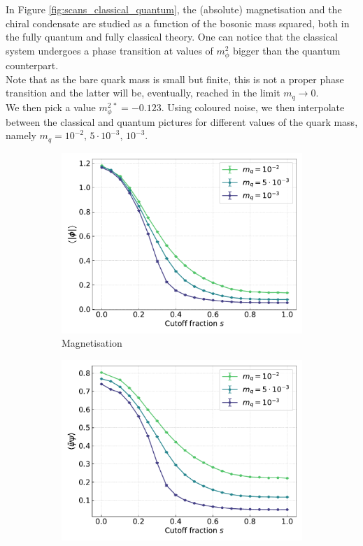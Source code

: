 In Figure \ref{fig:scans_classical_quantum}, the (absolute) magnetisation and the chiral condensate are studied as a function of the bosonic mass squared, both in the fully quantum and fully classical theory. One can notice that the classical system undergoes a phase transition at values of $m_\phi^2$ bigger than the quantum counterpart. \\
Note that as the bare quark mass is small but finite, this is not a proper phase transition and the latter will be, eventually, reached in the limit $m_q \to 0$. \\
We then pick a value $m_\phi^{2 \, *} = -0.123$. Using coloured noise, we then interpolate between the classical and quantum pictures for different values of the quark mass, namely $m_q = 10^{-2}, \, 5 \cdot 10^{-3}, \, 10^{-3}$.
\begin{figure}[h!]
\centering
\begin{subfigure}{0.49\textwidth}	
	\includegraphics[width=\textwidth]{figures/chiral_PT/magnetisation.pdf}
    \caption{Magnetisation}
\end{subfigure}
\begin{subfigure}{0.49\textwidth}	
	\includegraphics[width=\textwidth]{figures/chiral_PT/condensate.pdf}

\end{subfigure}
\end{figure}
